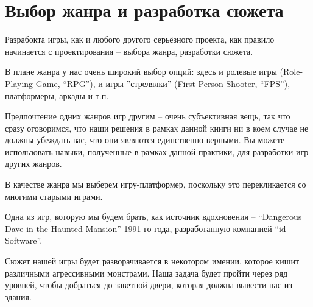 \documentclass[../sparc.tex]{subfiles}
\begin{document}
\section{Выбор жанра и разработка сюжета}

Разрабокта игры, как и любого другого серьёзного проекта, как правило начинается
с проектирования -- выбора жанра, разработки сюжета.

В плане жанра у нас очень широкий выбор опций: здесь и ролевые игры
(Role-Playing Game, ``RPG''), и игры-''стрелялки'' (First-Person Shooter,
``FPS''), платформеры, аркады и т.п.

Предпочтение одних жанров игр другим -- очень субъективная вещь, так что сразу
оговоримся, что наши решения в рамках данной книги ни в коем случае не должны
убеждать вас, что они являются единственно верными.  Вы можете использовать
навыки, полученные в рамках данной практики, для разработки игр других жанров.

В качестве жанра мы выберем игру-платформер, поскольку это перекликается со
многими старыми играми.

Одна из игр, которую мы будем брать, как источник вдохновения -- ``Dangerous
Dave in the Haunted Mansion'' 1991-го года, разработанную компанией ``id
Software''.

Сюжет нашей игры будет разворачивается в некотором имении, которое кишит
различными агрессивными монстрами.  Наша задача будет пройти через ряд уровней,
чтобы добраться до заветной двери, которая должна вывести нас из здания.
\end{document}
